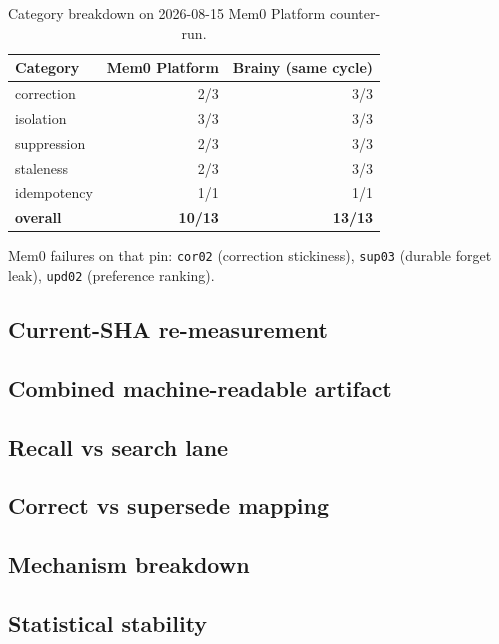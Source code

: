 \documentclass[11pt]{article}
\begin{document}
\begin{table}[h]
\centering
\caption{Category breakdown on 2026-08-15 Mem0 Platform counter-run.}
\begin{tabular}{lrr}
\toprule
Category & Mem0 Platform & Brainy (same cycle) \\
\midrule
correction & 2/3 & 3/3 \\
isolation & 3/3 & 3/3 \\
suppression & 2/3 & 3/3 \\
staleness & 2/3 & 3/3 \\
idempotency & 1/1 & 1/1 \\
\midrule
\textbf{overall} & \textbf{10/13} & \textbf{13/13} \\
\bottomrule
\end{tabular}
\end{table}

Mem0 failures on that pin: \texttt{cor02} (correction stickiness),
\texttt{sup03} (durable forget leak), \texttt{upd02} (preference ranking).

\subsection{Current-SHA re-measurement}
\label{sec:current}


\subsection{Combined machine-readable artifact}


\subsection{Recall vs search lane}
\label{sec:lane}


\subsection{Correct vs supersede mapping}


\subsection{Mechanism breakdown}


\subsection{Statistical stability}

\end{document}

